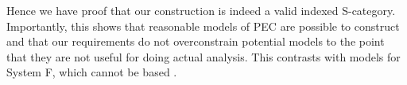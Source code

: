 Hence we have proof that our construction is indeed a valid indexed S-category. Importantly, this shows that reasonable models of PEC are possible to construct and that our requirements do not overconstrain potential models to the point that they are not useful for doing actual analysis. This contrasts with models for System F, which cannot be \set\s based \cite{PolymorphismIsNotSetTheoretic}.